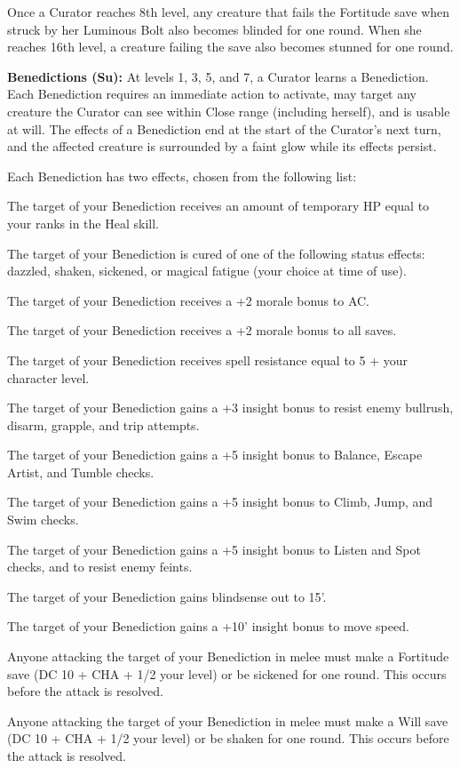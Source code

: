Once a Curator reaches 8th level, any creature that fails the Fortitude save when struck by her Luminous Bolt also becomes blinded for one round. When she reaches 16th level, a creature failing the save also becomes stunned for one round.

\textbf{Benedictions (Su):} At levels 1, 3, 5, and 7, a Curator learns a Benediction. Each Benediction requires an immediate action to activate, may target any creature the Curator can see within Close range (including herself), and is usable at will. The effects of a Benediction end at the start of the Curator's next turn, and the affected creature is surrounded by a faint glow while its effects persist.

Each Benediction has two effects, chosen from the following list:
\begin{itemize*}
\item The target of your Benediction receives an amount of temporary HP equal to your ranks in the Heal skill.
\item The target of your Benediction is cured of one of the following status effects: dazzled, shaken, sickened, or magical fatigue (your choice at time of use).
\item The target of your Benediction receives a +2 morale bonus to AC.
\item The target of your Benediction receives a +2 morale bonus to all saves.
\item The target of your Benediction receives spell resistance equal to 5 + your character level.
\item The target of your Benediction gains a +3 insight bonus to resist enemy bullrush, disarm, grapple, and trip attempts.
\item The target of your Benediction gains a +5 insight bonus to Balance, Escape Artist, and Tumble checks.
\item The target of your Benediction gains a +5 insight bonus to Climb, Jump, and Swim checks.
\item The target of your Benediction gains a +5 insight bonus to Listen and Spot checks, and to resist enemy feints.
\item The target of your Benediction gains blindsense out to 15'.
\item The target of your Benediction gains a +10' insight bonus to move speed.
\item Anyone attacking the target of your Benediction in melee must make a Fortitude save (DC 10 + CHA + 1/2 your level) or be sickened for one round. This occurs before the attack is resolved.
\item Anyone attacking the target of your Benediction in melee must make a Will save (DC 10 + CHA + 1/2 your level) or be shaken for one round. This occurs before the attack is resolved.
\end{itemize*}

